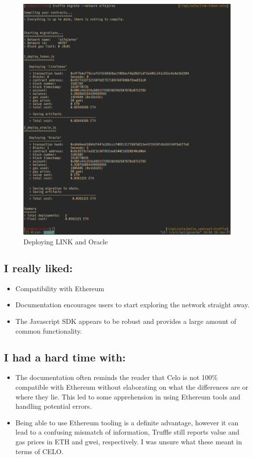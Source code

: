 \documentclass[a4paper,11pt]{article}
\begin{document}
\begin{figure}[hbt!]
  \centering
  \includegraphics{deploy-chainlink}
  \caption{Deploying LINK and Oracle}
  \label{fig:chainlink}
\end{figure}

\subsection*{I really liked:}
\begin{itemize}
\item Compatibility with Ethereum
\item Documentation encourages users to start exploring the network straight
  away.
\item The Javascript SDK appears to be robust and provides a large amount of
  common functionality.
\end{itemize}
\subsection*{I had a hard time with:}
\begin{itemize}
\item The documentation often reminds the reader that Celo is not 100\%
  compatible with Ethereum without elaborating on what the differences are or
  where they lie.  This led to some apprehension in using Ethereum tools and
  handling potential errors.
\item Being able to use Ethereum tooling is a definite advantage, however it can
  lead to a confusing mismatch of information, Truffle still reports value and
  gas prices in ETH and gwei, respectively.  I was unsure what these meant in
  terms of CELO.
\end{itemize}
\end{document}
